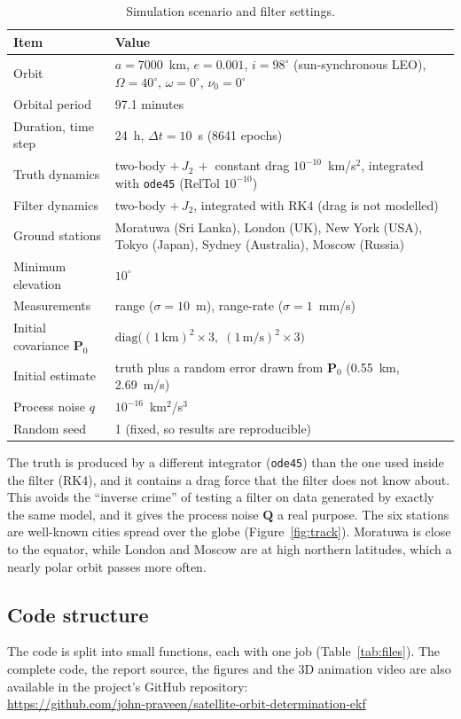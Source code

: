 \documentclass[11pt,a4paper]{article}
\newcommand{\bP}{\mathbf{P}}
\newcommand{\bQ}{\mathbf{Q}}
\begin{document}
\begin{table}[H]
\centering
\caption{Simulation scenario and filter settings.}
\label{tab:scenario}
\begin{tabular}{lp{}}
\toprule
\textbf{Item} & \textbf{Value} \\
\midrule
Orbit & $a=7000$~km, $e=0.001$, $i=98^\circ$ (sun-synchronous LEO), $\Omega=40^\circ$, $\omega=0^\circ$, $\nu_0=0^\circ$ \\
Orbital period & 97.1 minutes \\
Duration, time step & 24~h, $\Delta t=10$~s (8641 epochs) \\
Truth dynamics & two-body $+\,J_2\,+$ constant drag $10^{-10}$~km/s$^2$, integrated with \texttt{ode45} (RelTol $10^{-10}$) \\
Filter dynamics & two-body $+\,J_2$, integrated with RK4 (drag is not modelled) \\
Ground stations & Moratuwa (Sri Lanka), London (UK), New York (USA), Tokyo (Japan), Sydney (Australia), Moscow (Russia) \\
Minimum elevation & $10^\circ$ \\
Measurements & range ($\sigma=10$~m), range-rate ($\sigma=1$~mm/s) \\
Initial covariance $\bP_0$ & $\mathrm{diag}\bigl((1\,\text{km})^2\times3,\;(1\,\text{m/s})^2\times3\bigr)$ \\
Initial estimate & truth plus a random error drawn from $\bP_0$ (0.55~km, 2.69~m/s) \\
Process noise $q$ & $10^{-16}$~km$^2$/s$^3$ \\
Random seed & 1 (fixed, so results are reproducible) \\
\bottomrule
\end{tabular}
\end{table}

The truth is produced by a different integrator (\texttt{ode45}) than the one used inside the filter (RK4), and it contains a drag force that the filter does not know about. This avoids the ``inverse crime'' of testing a filter on data generated by exactly the same model, and it gives the process noise $\bQ$ a real purpose.
The six stations are well-known cities spread over the globe (Figure~\ref{fig:track}). Moratuwa is close to the equator, while London and Moscow are at high northern latitudes, which a nearly polar orbit passes more often.

\subsection{Code structure}
\label{sec:code}
The code is split into small functions, each with one job (Table~\ref{tab:files}). The complete code, the report source, the figures and the 3D animation video are also available in the project's GitHub repository:\\
\url{https://github.com/john-praveen/satellite-orbit-determination-ekf}
\end{document}
